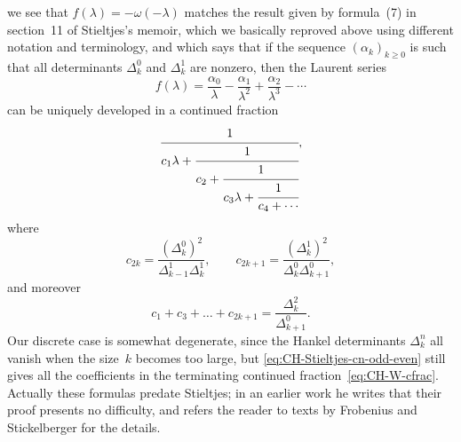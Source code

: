 \documentclass[10pt,a4paper]{article} \pdfoutput=1 
\begin{document}
\begin{remark}
  we see that $f(\lambda) = -\omega(-\lambda)$ matches the result given by
  formula~(7) in section~11 of Stieltjes's memoir,
  which we basically reproved above using different notation and terminology,
  and which says that if the sequence
  $(\alpha_k)_{k \ge 0}$ is such that all determinants $\Delta_k^0$ and $\Delta_k^1$
  are nonzero, then the Laurent series
  \begin{equation*}
    f(\lambda) = \frac{\alpha_0}{\lambda}-\frac{\alpha_1}{\lambda^2}+\frac{\alpha_2}{\lambda^3}-\dotsb
  \end{equation*}
  can be uniquely developed in a continued fraction
  \begin{equation*}
    \cfrac{1}{c_1\lambda+ \cfrac{1}{c_2+\cfrac{1}{c_3\lambda+\cfrac{1}{c_4 + \dotsb}}}},
  \end{equation*}
  where
  \begin{equation}
    \label{eq:CH-Stieltjes-cn-odd-even}
    c_{2k}=\frac{(\Delta_k^0)^2}{\Delta_{k-1}^1 \Delta_k^1}
    , \qquad
    c_{2k+1}=\frac{(\Delta_k^1)^2}{\Delta_k^0 \Delta_{k+1}^0}
    ,
  \end{equation}
  and moreover
  \begin{equation}
    \label{eq:CH-Stieltjes-cn-sum}
    c_1 + c_3 + \dots + c_{2k+1} = \frac{\Delta_{k}^2}{\Delta_{k+1}^0}
    .
  \end{equation}
  Our discrete case is somewhat degenerate, since the Hankel determinants $\Delta_k^n$
  all vanish when the size~$k$ becomes too large,
  but \eqref{eq:CH-Stieltjes-cn-odd-even} still gives
  all the coefficients in the terminating continued fraction~\eqref{eq:CH-W-cfrac}.
  Actually these formulas predate Stieltjes;
  in an earlier work \cite[p.~185]{stieltjes:1918:complete-works-2}
  he writes that their proof presents no difficulty,
  and refers the reader to texts by Frobenius and Stickelberger
  \cite{frobenius-stickelberger:1880:addition-multiplication-elliptischen-funktionen,frobenius:1881:relationen-zwischen-naherungsbruchen}
  for the details.
\end{remark}
\end{document}
